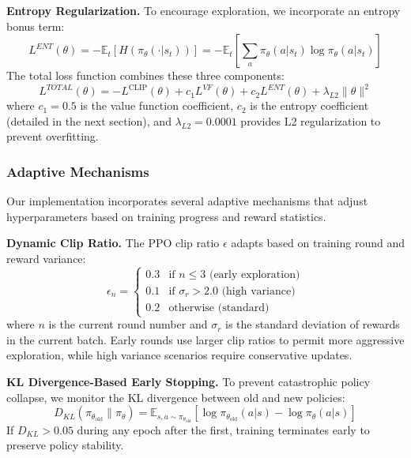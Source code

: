 \textbf{Entropy Regularization.} To encourage exploration, we incorporate an entropy bonus term:
%
\begin{equation}
L^{ENT}(\theta) = -\mathbb{E}_t\left[H(\pi_{\theta}(\cdot|s_t))\right] = -\mathbb{E}_t\left[\sum_{a} \pi_{\theta}(a|s_t)\log \pi_{\theta}(a|s_t)\right]
\end{equation}
%
The total loss function combines these three components:
%
\begin{equation}
L^{TOTAL}(\theta) = -L^{\text{CLIP}}(\theta) + c_1 L^{VF}(\theta) + c_2 L^{ENT}(\theta) + \lambda_{L2}\|\theta\|^2
\end{equation}
%
where $c_1 = 0.5$ is the value function coefficient, $c_2$ is the entropy coefficient (detailed in the next section), and $\lambda_{L2} = 0.0001$ provides L2 regularization to prevent overfitting.

\subsubsection{Adaptive Mechanisms}

Our implementation incorporates several adaptive mechanisms that adjust hyperparameters based on training progress and reward statistics.

\textbf{Dynamic Clip Ratio.} The PPO clip ratio $\epsilon$ adapts based on training round and reward variance:
%
\begin{equation}
\epsilon_n = \begin{cases}
0.3 & \text{if } n \leq 3 \text{ (early exploration)} \\
0.1 & \text{if } \sigma_r > 2.0 \text{ (high variance)} \\
0.2 & \text{otherwise (standard)}
\end{cases}
\end{equation}
%
where $n$ is the current round number and $\sigma_r$ is the standard deviation of rewards in the current batch. Early rounds use larger clip ratios to permit more aggressive exploration, while high variance scenarios require conservative updates.

\textbf{KL Divergence-Based Early Stopping.} To prevent catastrophic policy collapse, we monitor the KL divergence between old and new policies:
%
\begin{equation}
D_{KL}(\pi_{\theta_{\text{old}}} \| \pi_{\theta}) = \mathbb{E}_{s,a \sim \pi_{\theta_{\text{old}}}}\left[\log \pi_{\theta_{\text{old}}}(a|s) - \log \pi_{\theta}(a|s)\right]
\end{equation}
%
If $D_{KL} > 0.05$ during any epoch after the first, training terminates early to preserve policy stability.

